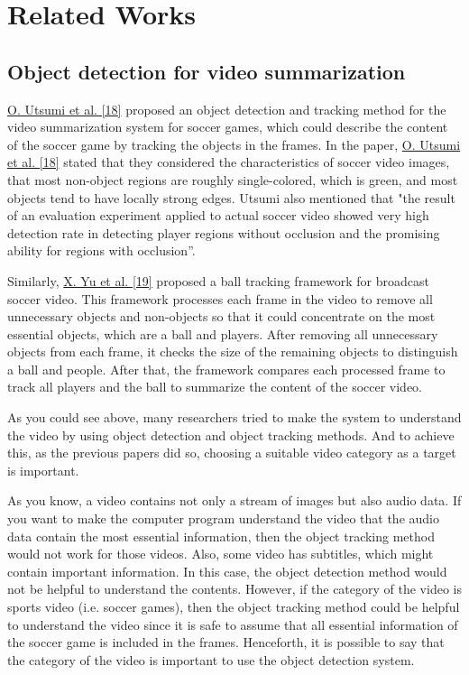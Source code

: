 \documentclass{article}
\begin{document}
\section{Related Works}

\subsection{Object detection for video summarization}

\hyperlink{ref18}{O. Utsumi et al. [18]} proposed an object detection and tracking method for the video summarization system for soccer games, which could describe the content of the soccer game by tracking the objects in the frames. In the paper, \hyperlink{ref18}{O. Utsumi et al. [18]} stated that they considered the characteristics of soccer video images, that most non-object regions are roughly single-colored, which is green, and most objects tend to have locally strong edges. Utsumi also mentioned that "the result of an evaluation experiment applied to actual soccer video showed very high detection rate in detecting player regions without occlusion and the promising ability for regions with occlusion”.

Similarly, \hyperlink{ref19}{X. Yu et al. [19]} proposed a ball tracking framework for broadcast soccer video. This framework processes each frame in the video to remove all unnecessary objects and non-objects so that it could concentrate on the most essential objects, which are a ball and players. After removing all unnecessary objects from each frame, it checks the size of the remaining objects to distinguish a ball and people. After that, the framework compares each processed frame to track all players and the ball to summarize the content of the soccer video.

As you could see above, many researchers tried to make the system to understand the video by using object detection and object tracking methods. And to achieve this, as the previous papers did so, choosing a suitable video category as a target is important.

As you know, a video contains not only a stream of images but also audio data. If you want to make the computer program understand the video that the audio data contain the most essential information, then the object tracking method would not work for those videos. Also, some video has subtitles, which might contain important information. In this case, the object detection method would not be helpful to understand the contents. However, if the category of the video is sports video (i.e. soccer games), then the object tracking method could be helpful to understand the video since it is safe to assume that all essential information of the soccer game is included in the frames. Henceforth, it is possible to say that the category of the video is important to use the object detection system.
\end{document}
